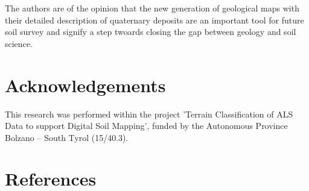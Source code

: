 \documentclass[preprint,12pt,authoryear]{elsarticle}
\begin{document}
The authors are of the opinion that the new generation of geological maps with their detailed description of quaternary deposits are an important tool for future soil survey and signify a step twoards closing the gap between geology and soil science. 


\section*{Acknowledgements} This research was performed within the project 'Terrain Classification of ALS Data to support Digital Soil Mapping', funded by the Autonomous Province Bolzano -- South Tyrol (15/40.3).

\section*{References}

\end{document}
